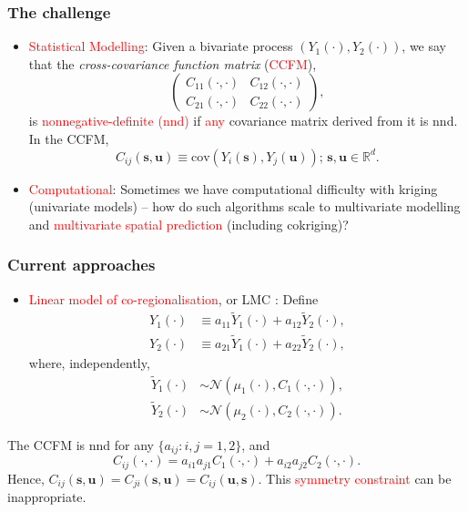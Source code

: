 \documentclass{beamer}
\newcommand{\Yt}{\widetilde{Y}}
\newcommand{\s}{\mathbf{s}}
\renewcommand{\u}{\mathbf{u}}
\newcommand{\cov}{\mathrm{cov}}
\begin{document}

\begin{frame}
\frametitle{The challenge}

\begin{itemize}
\item \textcolor{red}{Statistical Modelling}: Given a bivariate process $(Y_1(\cdot), Y_2(\cdot))$, we say that the \emph{cross-covariance function matrix} (\textcolor{red}{CCFM}),
\begin{equation*}
\label{eq1}
\left(\begin{array}{cc} C_{11}(\cdot,\cdot) & C_{12}(\cdot,\cdot) \\ C_{21}(\cdot,\cdot) & C_{22}(\cdot,\cdot)\end{array} \right),
\end{equation*}
is \textcolor{red}{nonnegative-definite (nnd)} if \textcolor{red}{any} covariance matrix derived from it is nnd. In the CCFM,
$$
C_{ij}(\s,\u)\equiv\cov(Y_i(\s),Y_j(\u));\,\s,\u\in\mathbb{R}^d.
$$
\item \textcolor{red}{Computational}: Sometimes we have computational difficulty with kriging (univariate models) -- how do such algorithms scale to multivariate modelling and \textcolor{red}{multivariate spatial prediction} (including cokriging)? %
\end{itemize}
\end{frame}



\begin{frame}
\frametitle{Current approaches}

\begin{itemize}
\item \textcolor{red}{Linear model of co-regionalisation}, or LMC \citep{JournelHuijbregts1978, Wackernagel1995}: Define
\begin{align*}
    Y_1(\cdot) &\equiv a_{11}\Yt_1(\cdot) + a_{12}\Yt_2(\cdot),\\
    Y_2(\cdot) &\equiv a_{21}\Yt_1(\cdot) + a_{22}\Yt_2(\cdot),
\end{align*}
where, independently,
\begin{align*}
    \Yt_1(\cdot) &\sim \mathcal{N}(\mu_1(\cdot), C_{1}(\cdot,\cdot)),\\
    \Yt_2(\cdot) &\sim \mathcal{N}(\mu_2(\cdot), C_{2}(\cdot,\cdot)).
\end{align*}
\end{itemize}
The CCFM is nnd for any $\{a_{ij}: i,j = 1,2\}$, and 
$$
C_{ij}(\cdot,\cdot) = a_{i1}a_{j1}C_{1}(\cdot,\cdot) + a_{i2}a_{j2}C_{2}(\cdot,\cdot).
$$ 
Hence, $C_{ij}(\s,\u)=C_{ji}(\s,\u)=C_{ij}(\u,\s)$. This \textcolor{red}{symmetry constraint} can be inappropriate.

\end{frame}
\end{document}
